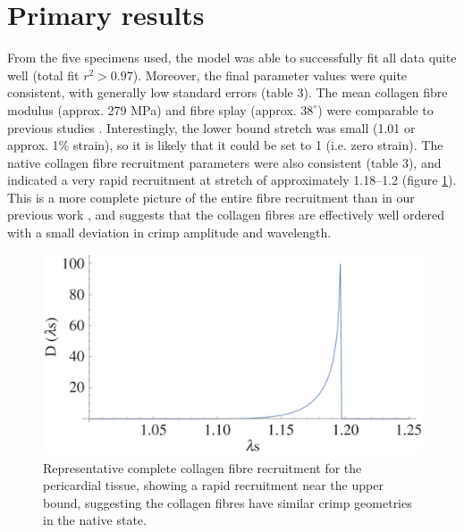 \section{Primary results}
    
    From the five specimens used, the model was able to successfully fit all data quite well (total fit $r^2 > 0.97$). Moreover, the final parameter values were quite consistent, with generally low standard errors (table 3). The mean collagen fibre modulus (approx. 279 MPa) and fibre splay (approx. $38^\circ$) were comparable to previous studies \cite{fan_simulation_2014}. Interestingly, the lower bound stretch was small (1.01 or approx. 1\% strain), 
    so it is likely that it could be set to 1 (i.e. zero strain). The native collagen fibre recruitment parameters were also consistent (table 3), and indicated a very rapid recruitment at stretch of approximately 1.18–1.2 (figure \ref{c3:fig:9}). This is a more complete picture of the entire fibre recruitment than in our previous work \cite{sun_finite_2005,fan_simulation_2014}, and suggests that the collagen fibres are effectively well ordered with a small deviation in crimp amplitude and wavelength.
    
    
\begin{figure}
\centering
\includegraphics[width=\textwidth]{Images/chapter3/F9large.jpg}
\caption{Representative complete collagen fibre recruitment for the pericardial tissue, showing a rapid recruitment near the upper bound, suggesting the collagen fibres have similar crimp geometries in the native state.}
\label{c3:fig:9}
\end{figure}


